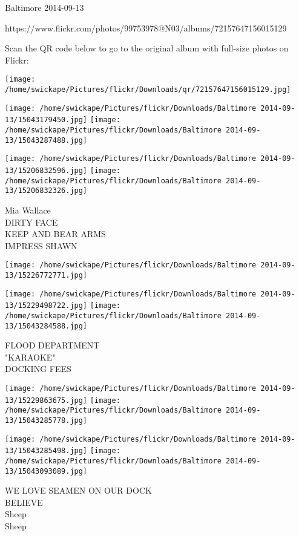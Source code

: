 \documentclass[10pt,letterpaper]{article}
\begin{document}
Baltimore 2014-09-13

https://www.flickr.com/photos/99753978@N03/albums/72157647156015129

Scan the QR code below to go to the original album with full-size photos on Flickr:

\texttt{[image: /home/swickape/Pictures/flickr/Downloads/qr/72157647156015129.jpg]}
\pagebreak

\texttt{[image: /home/swickape/Pictures/flickr/Downloads/Baltimore 2014-09-13/15043179450.jpg]}
\texttt{[image: /home/swickape/Pictures/flickr/Downloads/Baltimore 2014-09-13/15043287488.jpg]}

\texttt{[image: /home/swickape/Pictures/flickr/Downloads/Baltimore 2014-09-13/15206832596.jpg]}
\texttt{[image: /home/swickape/Pictures/flickr/Downloads/Baltimore 2014-09-13/15206832326.jpg]}

Mia Wallace\\
DIRTY FACE\\
KEEP AND BEAR ARMS\\
IMPRESS SHAWN
\pagebreak

\texttt{[image: /home/swickape/Pictures/flickr/Downloads/Baltimore 2014-09-13/15226772771.jpg]}

\vspace{0.25in}
\texttt{[image: /home/swickape/Pictures/flickr/Downloads/Baltimore 2014-09-13/15229498722.jpg]}
\texttt{[image: /home/swickape/Pictures/flickr/Downloads/Baltimore 2014-09-13/15043284588.jpg]}

FLOOD DEPARTMENT\\
"KARAOKE"\\
DOCKING FEES
\pagebreak

\texttt{[image: /home/swickape/Pictures/flickr/Downloads/Baltimore 2014-09-13/15229863675.jpg]}
\texttt{[image: /home/swickape/Pictures/flickr/Downloads/Baltimore 2014-09-13/15043285778.jpg]}

\texttt{[image: /home/swickape/Pictures/flickr/Downloads/Baltimore 2014-09-13/15043285498.jpg]}
\texttt{[image: /home/swickape/Pictures/flickr/Downloads/Baltimore 2014-09-13/15043093089.jpg]}

WE LOVE SEAMEN ON OUR DOCK\\
BELIEVE\\
Sheep\\
Sheep
\pagebreak
\end{document}
